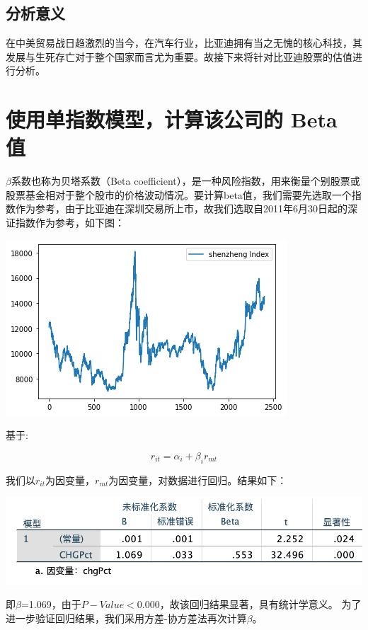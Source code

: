 \documentclass[UTF8]{ctexart}
\begin{document}
\subsection{分析意义}
在中美贸易战日趋激烈的当今，在汽车行业，比亚迪拥有当之无愧的核心科技，其发展与生死存亡对于整个国家而言尤为重要。故接下来将针对比亚迪股票的估值进行分析。
\section{使用单指数模型，计算该公司的 Beta 值}
$\beta$系数也称为贝塔系数（Beta coefficient），是一种风险指数，用来衡量个别股票或股票基金相对于整个股市的价格波动情况。要计算beta值，我们需要先选取一个指数作为参考，由于比亚迪在深圳交易所上市，故我们选取自2011年6月30日起的深证指数作为参考，如下图：\par
\begin{center}
\includegraphics[scale=0.6]{下载 (10).png}
\end{center}\par
基于:\par
$$r_{it} = \alpha_{i} + \beta_{i}r_{mt}$$\par
我们以$r_{it}$为因变量，$r_{mt}$为因变量，对数据进行回归。结果如下：
\begin{center}
\includegraphics[scale=0.6]{截屏2021-06-16 下午9.38.52.png}
\end{center}\par
即$\beta$=1.069，由于$P-Value<0.000$，故该回归结果显著，具有统计学意义。
为了进一步验证回归结果，我们采用方差-协方差法再次计算$\beta$。\par
\end{document}

